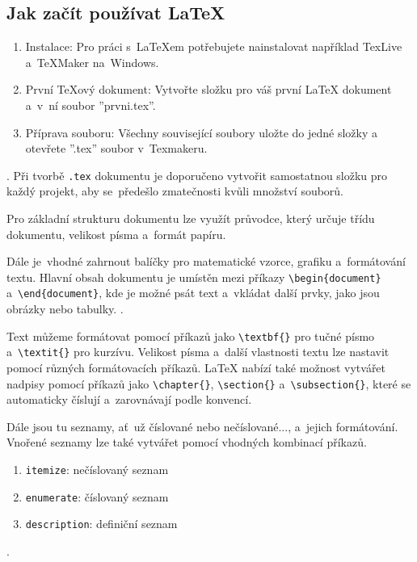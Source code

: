 \documentclass[a4paper, 11pt]{article}
\begin{document}
\subsection{Jak začít používat \LaTeX}
\begin{enumerate}
    \item Instalace: Pro práci s~\LaTeX{}em potřebujete nainstalovat například TexLive a~TeXMaker na~Windows.
    \item První TeXový dokument: Vytvořte složku pro váš první \LaTeX{} dokument a~v~ní soubor ''prvni.tex''.
    \item Příprava souboru: Všechny související soubory uložte do jedné složky a otevřete ''.tex'' soubor v~Texmakeru.
\end{enumerate}
\cite{Vyfuk2024}.
Při tvorbě \texttt{.tex} dokumentu je doporučeno vytvořit samostatnou složku pro každý projekt, aby se~předešlo zmatečnosti kvůli množství souborů. 

Pro základní strukturu dokumentu lze využít průvodce, který určuje třídu dokumentu, velikost písma a~formát papíru. 

Dále je~vhodné zahrnout balíčky pro matematické vzorce, grafiku a~formátování textu. Hlavní obsah dokumentu je umístěn mezi příkazy \texttt{\textbackslash begin\{document\}} a~\texttt{\textbackslash end\{document\}}, 
kde je možné psát text a~vkládat další prvky, jako jsou obrázky nebo tabulky.
\cite{Simecek2013}.

Text můžeme formátovat pomocí příkazů jako \texttt{\textbackslash textbf\{\}} pro tučné písmo a~\texttt{\textbackslash textit\{\}} pro kurzívu. 
Velikost písma a~další vlastnosti textu lze nastavit pomocí různých formátovacích příkazů. 
\LaTeX{} nabízí také možnost vytvářet nadpisy pomocí příkazů jako \texttt{\textbackslash chapter\{\}}, \texttt{\textbackslash section\{\}} a~\texttt{\textbackslash subsection\{\}}, které se automaticky číslují a~zarovnávají podle konvencí. 

Dále jsou tu seznamy, ať~už číslované nebo nečíslované..., a~jejich formátování. Vnořené seznamy lze také vytvářet pomocí vhodných kombinací příkazů.
\begin{enumerate}
    \item \texttt{itemize}: nečíslovaný seznam
    \item \texttt{enumerate}: číslovaný seznam
    \item \texttt{description}: definiční seznam
\end{enumerate}
\cite{Lehocky2014}.
\end{document}
